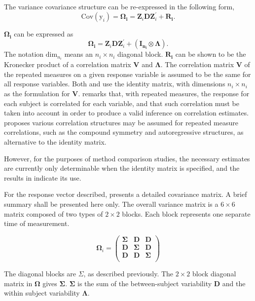 \documentclass[12pt, a4paper]{report}
\theoremstyle{plain}
\theoremstyle{definition}
\theoremstyle{remark}
\begin{document}
The variance covariance structure can be re-expressed in the following form,
\[
\mbox{Cov}(\mbox{y}_{i}) = \boldsymbol{\Omega_{i}} = \boldsymbol{Z}_{i}\boldsymbol{D}\boldsymbol{Z}_{i}^\prime + \boldsymbol{R_{i}}.
\]

$\boldsymbol{\Omega_{i}}$ can be expressed as
\[
\boldsymbol{\Omega_{i}} = \boldsymbol{Z}_{i}\boldsymbol{D}\boldsymbol{Z}_{i}^\prime + ({\boldsymbol{I_{n_{i}}} \otimes \boldsymbol{\Lambda}}).
\]
The notation $\mbox{dim}_{n_{i}}$ means an $n_{i} \times n_{i}$ diagonal block.
$\boldsymbol{R_{i}}$ can be shown to be the Kronecker product of a correlation matrix $\boldsymbol{V}$ and $\boldsymbol{\Lambda}$. The correlation matrix $\boldsymbol{V}$ of the repeated measures on a given response variable is assumed to be the same for all response variables. Both \citet{hamlett} and \citet{lam} use the identity matrix, with dimensions $n_{i} \times n_{i}$ as the formulation for $\boldsymbol{V}$. \citet{roy} remarks that, with repeated measures, the response for each subject is correlated for each variable, and that such correlation must be taken into account in order to produce a valid inference on correlation estimates.  \citet{roy2006} proposes various correlation structures may be assumed for repeated measure correlations, such as the compound symmetry and autoregressive structures, as alternative to the identity matrix.


However, for the purposes of method comparison studies, the necessary estimates are currently only determinable when the identity matrix is specified, and the results in \citet{roy} indicate its use.

For the response vector described, \citet{hamlett} presents a detailed covariance matrix. A brief summary shall be presented here only. The overall variance matrix is a $6 \times 6$ matrix composed of two types of $2 \times 2$ blocks. Each block represents one separate time of measurement.

\[
\boldsymbol{\Omega}_{i} = \left(
\begin{array}{ccc}
\boldsymbol{\Sigma} & \boldsymbol{D} & \boldsymbol{D}\\
\boldsymbol{D} & \boldsymbol{\Sigma} & \boldsymbol{D}\\
\boldsymbol{D} & \boldsymbol{D} & \boldsymbol{\Sigma}\\
\end{array}\right)
\]

The diagonal blocks are $\Sigma$, as described previously. The $2 \times 2$ block diagonal matrix in $\boldsymbol{\Omega}$ gives $\boldsymbol{\Sigma}$. $\boldsymbol{\Sigma}$ is the sum of the between-subject variability $\boldsymbol{D}$ and the within subject variability $\boldsymbol{\Lambda}$.
\end{document}
